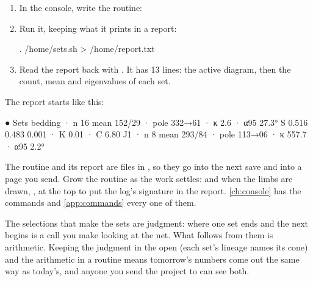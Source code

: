 \begin{tryit}
\begin{enumerate}
\item In the console, write the routine:
\item Run it, keeping what it prints in a report:
\begin{codeblock}
. /home/sets.sh > /home/report.txt
\end{codeblock}
\item Read the report back with . It has 13 lines: the active diagram, then
the count, mean and eigenvalues of each set.
\end{enumerate}
\end{tryit}


The report starts like this:

\begin{codeblock}
● Sets
bedding · n 16
mean 152/29 · pole 332→61 · κ 2.6 · α95 27.3°
S 0.516 0.483 0.001 · K 0.01 · C 6.80
J1 · n 8
mean 293/84 · pole 113→06 · κ 557.7 · α95 2.2°
\end{codeblock}

The routine and its report are files in , so they go into the next save and into a page you
send. Grow the routine as the work settles:  and  when the
limbs are drawn, ,  at the top to put the log's signature in the
report. \cref{ch:console} has the commands and \cref{app:commands} every one of them.

\begin{why}
The selections that make the sets are judgment: where one set ends and the next begins is a call you
make looking at the net. What follows from them is arithmetic. Keeping the judgment in the open (each
set's lineage names its cone) and the arithmetic in a routine means tomorrow's numbers come out the same
way as today's, and anyone you send the project to can see both.
\end{why}
